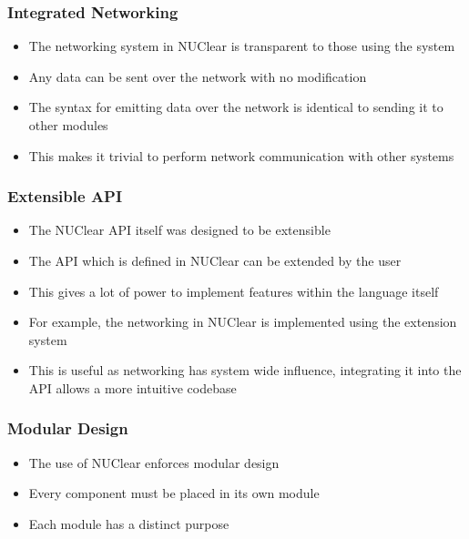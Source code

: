\documentclass{beamer}
\begin{document}
\begin{frame}
	\frametitle{Integrated Networking}
	\begin{itemize}
		\item The networking system in NUClear is transparent to those using the system
		\item Any data can be sent over the network with no modification
		\item The syntax for emitting data over the network is identical to sending it to other modules
		\item This makes it trivial to perform network communication with other systems
	\end{itemize}
\end{frame}

\begin{frame}
	\frametitle{Extensible API}
	\begin{itemize}
		\item The NUClear API itself was designed to be extensible
		\item The API which is defined in NUClear can be extended by the user
		\item This gives a lot of power to implement features within the language itself
		\item For example, the networking in NUClear is implemented using the extension system
		\item This is useful as networking has system wide influence, integrating it into the API allows a more intuitive codebase
	\end{itemize}
\end{frame}

\begin{frame}
	\frametitle{Modular Design}
	\begin{itemize}
		\item The use of NUClear enforces modular design
		\item Every component must be placed in its own module
		\item Each module has a distinct purpose
	\end{itemize}
\end{frame}


\end{document}
